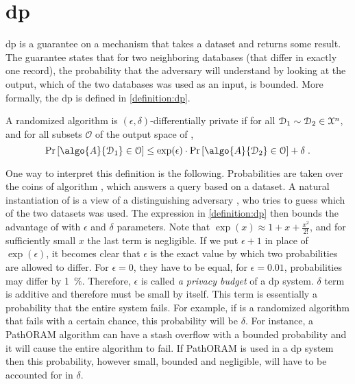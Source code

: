 	\section{\texorpdfstring{\acrlong{dp}}{Differential Privacy}}

		\acrfull{dp} is a guarantee on a mechanism that takes a dataset and returns some result.
		The guarantee states that for two neighboring databases (that differ in exactly one record), the probability that the adversary will understand by looking at the output, which of the two databases was used as an input, is bounded.
		More formally, the \acrlong{dp} is defined in \cref{definition:dp}.

		\begin{definition}\label{definition:dp}
			A randomized algorithm  is $(\epsilon, \delta)$-differentially private if for all $\mathcal{D}_1 \sim \mathcal{D}_2 \in \mathcal{X}^{n}$, and for all subsets $\mathcal{O}$ of the output space of ,
			\[
				\probability{ \algo{A}{ \database_1 } \in \mathcal{O} } \leq \exp(\epsilon) \cdot \probability{ \algo{A}{ \database_2 } \in \mathcal{O} } + \delta \; .
			\]
		\end{definition}

		One way to interpret this definition is the following.
		Probabilities are taken over the coins of algorithm , which answers a query based on a dataset.
		A natural instantiation of  is a view of a distinguishing adversary \adversary{}, who tries to guess which of the two datasets was used.
		The expression in \cref{definition:dp} then bounds the advantage of \adversary{} with $\epsilon$ and $\delta$ parameters.
		Note that $\exp( x ) \approx 1 + x + \frac{x^2}{2!}$, and for sufficiently small $x$ the last term is negligible.
		If we put $\epsilon + 1$ in place of $\exp( \epsilon )$, it becomes clear that $\epsilon$ is the exact value by which two probabilities are allowed to differ.
		For $\epsilon = 0$, they have to be equal, for $\epsilon = 0.01$, probabilities may differ by \SI{1}{\percent}.
		Therefore, $\epsilon$ is called \emph{a privacy budget} of a \acrshort{dp} system.
		$\delta$ term is additive and therefore must be small by itself.
		This term is essentially a probability that the entire system fails.
		For example, if  is a randomized algorithm that fails with a certain chance, this probability will be $\delta$.
		For instance, a PathORAM \cite{path-oram} algorithm can have a stash overflow with a bounded probability \cite[Theorem 1]{path-oram} and it will cause the entire algorithm to fail.
		If PathORAM is used in a \acrshort{dp} system then this probability, however small, bounded and negligible, will have to be accounted for in $\delta$.

